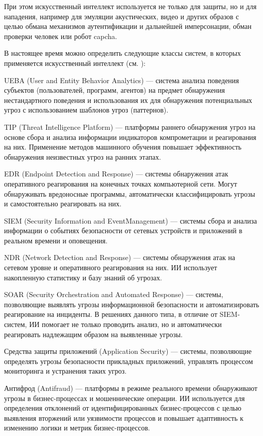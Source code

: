При этом искусственный интеллект используется не только для защиты, но и для нападения, например для эмуляции акустических, видео и других образов с целью обмана механизмов аутентификации и дальнейшей имперсонации, обман проверки человек или робот capcha.

В настоящее время можно определить следующие классы систем, в которых применяется искусственный интеллект (см. ):

\begin{textitemize}
	\item UEBA (User and Entity Behavior Analytics) --- система анализа поведения субъектов (пользователей, программ, агентов) на предмет обнаружения нестандартного поведения и использования их для обнаружения потенциальных угроз с использованием шаблонов угроз (паттернов).
	\item TIP (Threat Intelligence Platform) --- платформы раннего обнаружения угроз на основе сбора и анализа информации индикаторов компрометации и реагирования на них. Применение методов машинного обучения повышает эффективность обнаружения неизвестных угроз на ранних этапах.
	\item EDR (Endpoint Detection and Response) --- системы обнаружения атак оперативного реагирования на конечных точках компьютерной сети. Могут обнаруживать вредоносные программы, автоматически классифицировать угрозы и самостоятельно реагировать на них.
	\item SIEM (Security Information and EventManagement) --- системы сбора и анализа информации о событиях безопасности от сетевых устройств и приложений в реальном времени и оповещения.
	\item NDR (Network Detection and Response) --- системы обнаружения атак на сетевом уровне и оперативного реагирования на них. ИИ использует накопленную статистику и базу знаний об угрозах.
	\item SOAR (Security Orchestration and Automated Response) --- системы, позволяющие выявлять угрозы информационной безопасности и автоматизировать реагирование на инциденты. В решениях данного типа, в отличие от SIEM-систем, ИИ помогает не только проводить анализ, но и автоматически реагировать надлежащим образом на выявленные угрозы.
	\item Средства защиты приложений (Application Security) --- системы, позволяющие определять угрозы безопасности прикладных приложений, управлять процессом мониторинга и устранения таких угроз.
	\item Антифрод (Antifraud) --- платформы в режиме реального времени обнаруживают угрозы в бизнес-процессах и мошеннические операции. ИИ используется для определения отклонений от идентифицированных бизнес-процессов с целью выявления вторжений или уязвимости процессов и повышает адаптивность к изменению логики и метрик бизнес-процессов.
\end{textitemize}


